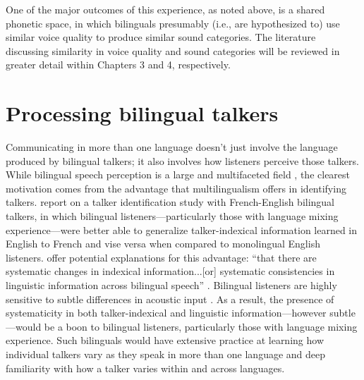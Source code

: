 One of the major outcomes of this experience, as noted above, is a shared phonetic space, in which bilinguals presumably (i.e., are hypothesized to) use similar voice quality to produce similar sound categories. The literature discussing similarity in voice quality and sound categories will be reviewed in greater detail within Chapters 3 and 4, respectively. %




\section{Processing bilingual talkers}\label{ch1:sec:processing}

Communicating in more than one language doesn't just involve the language produced by bilingual talkers; it also involves how listeners perceive those talkers. While bilingual speech perception is a large and multifaceted field \citep{ingvalson_2014_bilingual}, the clearest motivation comes from the advantage that multilingualism offers in identifying talkers. \citet{orena_2019_identifying} report on a talker identification study with French-English bilingual talkers, in which bilingual listeners---particularly those with language mixing experience---were better able to generalize talker-indexical information learned in English to French and vise versa when compared to monolingual English listeners. \citeauthor{orena_2019_identifying} offer potential explanations for this advantage: ``that there are systematic changes in indexical information...[or] systematic consistencies in linguistic information across bilingual speech'' \citeyearpar[][p. EL308]{orena_2019_identifying}. Bilingual listeners are highly sensitive to subtle differences in acoustic input \citep{ju_2004_falling}. As a result, the presence of systematicity in both talker-indexical and linguistic information---however subtle---would be a boon to bilingual listeners, particularly those with language mixing experience. Such bilinguals would have extensive practice at learning how individual talkers vary as they speak in more than one language and deep familiarity with how a talker varies within and across languages. 


